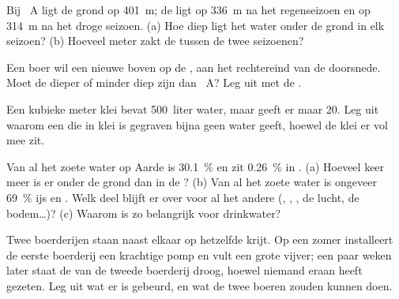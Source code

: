\begin{exercise}[$\star\star$]\label{exo:g6:water-underground:8}
Bij ~A ligt de grond op 401~m; de  ligt op 336~m na het
regenseizoen en op 314~m na het droge seizoen. (a) Hoe diep ligt het water
onder de grond in elk seizoen? (b) Hoeveel meter zakt de
 tussen de twee seizoenen?
\end{exercise}

\begin{exercise}[$\star\star$]\label{exo:g6:water-underground:9}
Een boer wil een nieuwe  boven op de , aan het rechtereind van de
doorsnede. Moet de  dieper of minder diep zijn dan ~A? Leg uit met de
.
\end{exercise}

\begin{exercise}[$\star\star$]\label{exo:g6:water-underground:10}
Een kubieke meter klei bevat 500~liter water, maar geeft er maar 20. Leg
uit waarom een  die in klei is gegraven bijna geen water geeft, hoewel
de klei er vol mee zit.
\end{exercise}

\begin{exercise}[$\star\star\star$]\label{exo:g6:water-underground:11}
Van al het zoete water op Aarde is 30.1~\%  en zit 0.26~\% in
. (a) Hoeveel keer meer  is er onder de grond dan in de
? (b) Van al het zoete water is ongeveer 69~\% ijs en . Welk
deel blijft er over voor al het andere (, , , de
lucht, de bodem\ldots)? (c) Waarom is  zo belangrijk voor
drinkwater?
\end{exercise}

\begin{exercise}[$\star\star\star$]\label{exo:g6:water-underground:12}
Twee boerderijen staan naast elkaar op hetzelfde krijt. Op een zomer
installeert de eerste boerderij een krachtige pomp en vult een grote
vijver; een paar weken later staat de  van de tweede boerderij droog,
hoewel niemand eraan heeft gezeten. Leg uit wat er is gebeurd, en wat de
twee boeren zouden kunnen doen.
\end{exercise}

